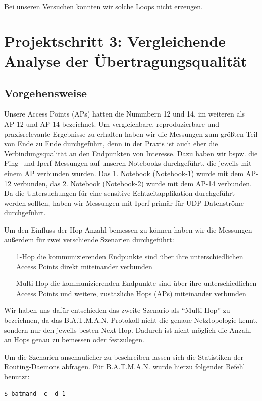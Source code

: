 \documentclass[a4paper,10pt]{article}
\begin{document}
Bei unseren Versuchen konnten wir solche Loops nicht erzeugen.

\section{Projektschritt 3: Vergleichende Analyse der Übertragungsqualität}

\subsection{Vorgehensweise}

Unsere Access Points (APs) hatten die Nummbern 12 und 14, im weiteren als AP-12 und AP-14 bezeichnet.
Um vergleichbare, reproduzierbare und praxisrelevante Ergebnisse zu erhalten haben wir die Messungen zum größten Teil von Ende zu Ende durchgeführt, denn in der Praxis ist auch eher die Verbindungsqualität an den Endpunkten von Interesse.
Dazu haben wir bspw. die Ping- und Iperf-Messungen auf unseren Notebooks durchgeführt, die jeweils mit einem AP verbunden wurden.
Das 1. Notebook (Notebook-1) wurde mit dem AP-12 verbunden, das 2. Notebook (Notebook-2) wurde mit dem AP-14 verbunden.
Da die Untersuchungen für eine sensitive Echtzeitapplikation durchgeführt werden sollten, haben wir Messungen mit Iperf primär für UDP-Datenströme durchgeführt.

Um den Einfluss der Hop-Anzahl bemessen zu können haben wir die Messungen außerdem für zwei verschiende Szenarien durchgeführt:
\begin{itemize}
  \item[1-Hop] die kommunizierenden Endpunkte sind über ihre unterschiedlichen Access Points direkt miteinander verbunden 
  \item[Multi-Hop] die kommunizierenden Endpunkte sind über ihre unterschiedlichen Access Points und weitere, zusätzliche Hops (APs) miteinander verbunden
\end{itemize}

Wir haben uns dafür entschieden das zweite Szenario als "`Multi-Hop"' zu bezeichnen, da das B.A.T.M.A.N.-Protokoll nicht die genaue Netztopologie kennt, sondern nur den jeweils besten Next-Hop.
Dadurch ist nicht möglich die Anzahl an Hops genau zu bemessen oder festzulegen.

Um die Szenarien anschaulicher zu beschreiben lassen sich die Statistiken der Routing-Daemons abfragen.
Für B.A.T.M.A.N. wurde hierzu folgender Befehl benutzt:

\begin{lstlisting}
$ batmand -c -d 1
\end{lstlisting}
\end{document}
